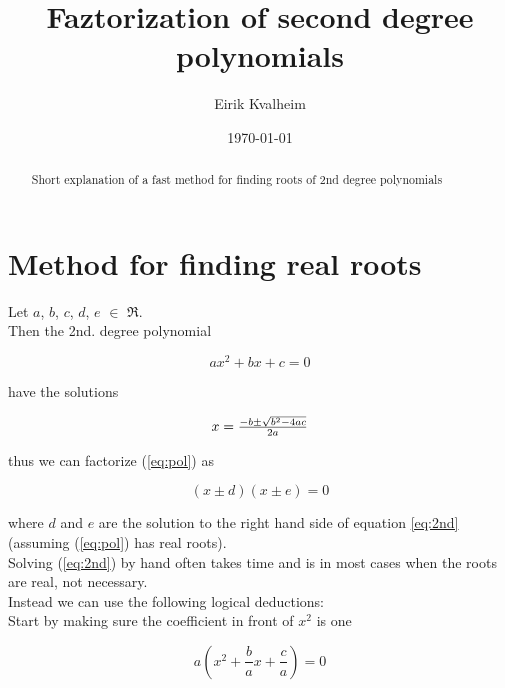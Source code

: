 \documentclass[a4paper]{article}
\title{Faztorization of second degree polynomials}
\author{Eirik Kvalheim}
\date{\today}
\begin{document}
\maketitle

\begin{abstract}
Short explanation of a fast method for finding roots of 2nd degree polynomials
\end{abstract}

\section{Method for finding real roots}
\label{sec:introduction}

Let $a$, $b$, $c$, $d$, $e$ $\in$ $\Re$.\\
Then the 2nd. degree polynomial

\begin{equation}  \label{eq:pol}
	ax^2 + bx + c = 0
\end{equation}

have the solutions

\begin{equation} \label{eq:2nd}
	\begin{array}
		{*{20}c} {x = \frac{{ - b \pm \sqrt {b^2 - 4ac} }}{{2a}}} \\ 
	\end{array}
\end{equation}


thus we can factorize (\ref{eq:pol}) as

\begin{equation} \label{eq:fac}
 (x\pm d)(x\pm e) = 0
\end{equation}

where $d$ and $e$ are the solution to the right hand side of equation \ref{eq:2nd} (assuming (\ref{eq:pol}) has real roots).\\ \newline Solving
(\ref{eq:2nd}) by hand often takes time and is in most cases when the roots are real, not necessary.\\
Instead we can use the following logical deductions:\\

Start by making sure the coefficient in front of $x^2$ is one

\begin{equation}  \label{eq:facto}
	a(x^2 + \frac{b}{a}x + \frac{c}{a}) = 0
\end{equation}
\end{document}
